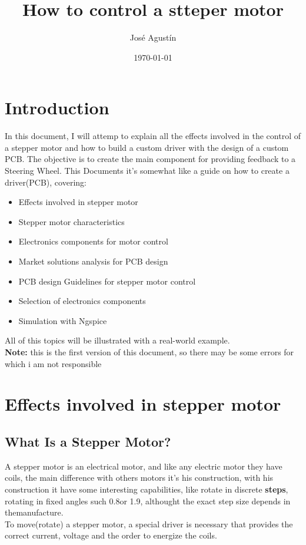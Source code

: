 \documentclass{report}
\title{How to control a stteper motor}
\author{José Agustín}
\date{\today}
\begin{document}
\maketitle 
\tableofcontents 

\chapter{Introduction}
In this document, I will attemp to explain all the effects involved in the control
of a stepper motor and how to build a custom driver with the design of a custom PCB.
The objective is to create the main component for providing feedback to a Steering Wheel.
This Documents it's somewhat like a guide on how to create a driver(PCB), covering:
\begin{itemize}
\item Effects involved in stepper motor
\item Stepper motor characteristics
\item Electronics components for motor control
\item Market solutions analysis for PCB design
\item PCB design Guidelines for stepper motor control
\item Selection of electronics components
\item Simulation with Ngspice
\end{itemize}
All of this topics will be illustrated with a real-world example.\\
\textbf{Note:} this is the first version of this document, so there may be 
some errors for which i am not responsible

\chapter{Effects involved in stepper motor}
\section{What Is a Stepper Motor?}
A stepper motor is an electrical motor, and like any electric motor they have coils, the main 
difference with others motors it's his construction, with his construction it have some interesting
capabilities, like rotate in discrete \textbf{steps}, rotating in fixed angles such 0.8\degree or 
1.9\degree, althought the exact step size depends in themanufacture.\\
To move(rotate) a stepper motor, a special driver is necessary that provides the correct current, voltage and
the order to energize the coils.
\end{document}
